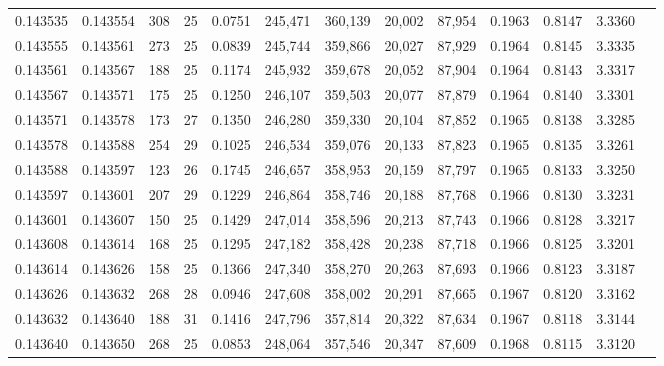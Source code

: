 \begin{tabular}{rrrrrrrrrrrrr}
0.143535 & 0.143554 & 308 &  25 &                                     0.0751 & 245,471 & 360,139 &  20,002 &  87,954 & 0.1963 & 0.8147 & 3.3360 \\
0.143555 & 0.143561 & 273 &  25 &                                     0.0839 & 245,744 & 359,866 &  20,027 &  87,929 & 0.1964 & 0.8145 & 3.3335 \\
0.143561 & 0.143567 & 188 &  25 &                                     0.1174 & 245,932 & 359,678 &  20,052 &  87,904 & 0.1964 & 0.8143 & 3.3317 \\
0.143567 & 0.143571 & 175 &  25 &                                     0.1250 & 246,107 & 359,503 &  20,077 &  87,879 & 0.1964 & 0.8140 & 3.3301 \\
0.143571 & 0.143578 & 173 &  27 &                                     0.1350 & 246,280 & 359,330 &  20,104 &  87,852 & 0.1965 & 0.8138 & 3.3285 \\
0.143578 & 0.143588 & 254 &  29 &                                     0.1025 & 246,534 & 359,076 &  20,133 &  87,823 & 0.1965 & 0.8135 & 3.3261 \\
0.143588 & 0.143597 & 123 &  26 &                                     0.1745 & 246,657 & 358,953 &  20,159 &  87,797 & 0.1965 & 0.8133 & 3.3250 \\
0.143597 & 0.143601 & 207 &  29 &                                     0.1229 & 246,864 & 358,746 &  20,188 &  87,768 & 0.1966 & 0.8130 & 3.3231 \\
0.143601 & 0.143607 & 150 &  25 &                                     0.1429 & 247,014 & 358,596 &  20,213 &  87,743 & 0.1966 & 0.8128 & 3.3217 \\
0.143608 & 0.143614 & 168 &  25 &                                     0.1295 & 247,182 & 358,428 &  20,238 &  87,718 & 0.1966 & 0.8125 & 3.3201 \\
0.143614 & 0.143626 & 158 &  25 &                                     0.1366 & 247,340 & 358,270 &  20,263 &  87,693 & 0.1966 & 0.8123 & 3.3187 \\
0.143626 & 0.143632 & 268 &  28 &                                     0.0946 & 247,608 & 358,002 &  20,291 &  87,665 & 0.1967 & 0.8120 & 3.3162 \\
0.143632 & 0.143640 & 188 &  31 &                                     0.1416 & 247,796 & 357,814 &  20,322 &  87,634 & 0.1967 & 0.8118 & 3.3144 \\
0.143640 & 0.143650 & 268 &  25 &                                     0.0853 & 248,064 & 357,546 &  20,347 &  87,609 & 0.1968 & 0.8115 & 3.3120 \\

\end{tabular}
